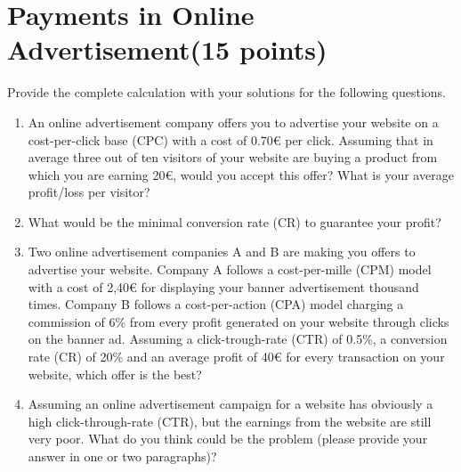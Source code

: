 \documentclass{WeSTassignment}
\begin{document}

\section{Payments in Online Advertisement(15 points)}

Provide the complete calculation with your solutions for the following questions.
\begin {enumerate}
\item An online advertisement company offers you to advertise your website on a
cost-per-click base (CPC) with a cost of 0.70€ per click. Assuming that in
average three out of ten visitors of your website are buying a product from which you are earning
20€, would you accept this offer? What is your average profit/loss per visitor?
\item What would be the minimal conversion rate (CR) to guarantee your profit? 
\item Two   online   advertisement   companies  A  and   B   are   making   you   offers   to
advertise your website. Company A follows a cost-per-mille (CPM) model with a
cost of 2,40€ for displaying your banner advertisement thousand times. Company B follows a cost-per-action (CPA) model charging a commission of 6\% from every profit generated on your website
through clicks on the banner ad. Assuming a click-trough-rate (CTR) of 0.5\%, a conversion rate (CR) of 20\% and an average profit of 40€ for every transaction on your website, which offer is the best? 
\item Assuming an online advertisement campaign for a website has obviously a high
click-through-rate (CTR), but the earnings from the website are still very poor.
What do you think could be the problem (please provide your answer in one or two paragraphs)?

\end{enumerate}
\end{document}
